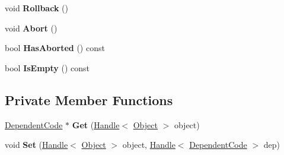 \begin{DoxyCompactItemize}
\item 
void {\bfseries Rollback} ()\hypertarget{classv8_1_1internal_1_1_compilation_dependencies_ab4692db26bf4bad4e918194c7182d606}{}\label{classv8_1_1internal_1_1_compilation_dependencies_ab4692db26bf4bad4e918194c7182d606}

\item 
void {\bfseries Abort} ()\hypertarget{classv8_1_1internal_1_1_compilation_dependencies_a5fa837aad0f1e766fbe211ec14266bd5}{}\label{classv8_1_1internal_1_1_compilation_dependencies_a5fa837aad0f1e766fbe211ec14266bd5}

\item 
bool {\bfseries Has\+Aborted} () const \hypertarget{classv8_1_1internal_1_1_compilation_dependencies_a851ab18d67e3410f1420e89472b7664c}{}\label{classv8_1_1internal_1_1_compilation_dependencies_a851ab18d67e3410f1420e89472b7664c}

\item 
bool {\bfseries Is\+Empty} () const \hypertarget{classv8_1_1internal_1_1_compilation_dependencies_abcb25a0c5b45a46eba09678fe5512113}{}\label{classv8_1_1internal_1_1_compilation_dependencies_abcb25a0c5b45a46eba09678fe5512113}

\end{DoxyCompactItemize}
\subsection*{Private Member Functions}
\begin{DoxyCompactItemize}
\item 
\hyperlink{classv8_1_1internal_1_1_dependent_code}{Dependent\+Code} $\ast$ {\bfseries Get} (\hyperlink{classv8_1_1internal_1_1_handle}{Handle}$<$ \hyperlink{classv8_1_1internal_1_1_object}{Object} $>$ object)\hypertarget{classv8_1_1internal_1_1_compilation_dependencies_a567271eb53c3ddd5260454a7ccbb4837}{}\label{classv8_1_1internal_1_1_compilation_dependencies_a567271eb53c3ddd5260454a7ccbb4837}

\item 
void {\bfseries Set} (\hyperlink{classv8_1_1internal_1_1_handle}{Handle}$<$ \hyperlink{classv8_1_1internal_1_1_object}{Object} $>$ object, \hyperlink{classv8_1_1internal_1_1_handle}{Handle}$<$ \hyperlink{classv8_1_1internal_1_1_dependent_code}{Dependent\+Code} $>$ dep)\hypertarget{classv8_1_1internal_1_1_compilation_dependencies_a52e226731ba425a3200efd7e5c896fa5}{}\label{classv8_1_1internal_1_1_compilation_dependencies_a52e226731ba425a3200efd7e5c896fa5}

\end{DoxyCompactItemize}
